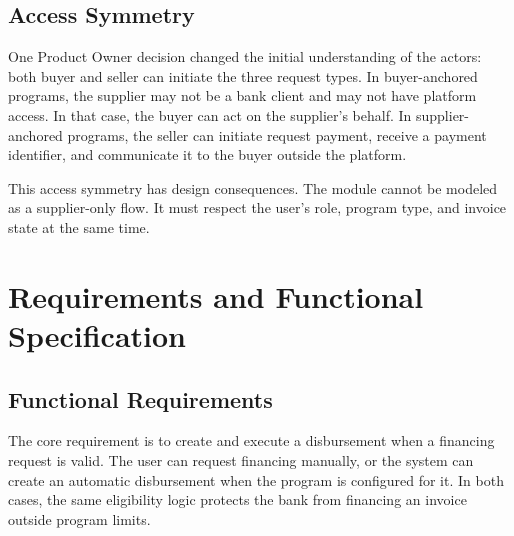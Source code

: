\subsection{Access Symmetry}
\label{subsec:ch5_access_symmetry}

One Product Owner decision changed the initial understanding of the actors: both buyer and seller can initiate the three request types. In buyer-anchored programs, the supplier may not be a bank client and may not have platform access. In that case, the buyer can act on the supplier's behalf. In supplier-anchored programs, the seller can initiate request payment, receive a payment identifier, and communicate it to the buyer outside the platform.

This access symmetry has design consequences. The module cannot be modeled as a supplier-only flow. It must respect the user's role, program type, and invoice state at the same time.

\section{Requirements and Functional Specification}
\label{sec:ch5_requirements}

\subsection{Functional Requirements}
\label{subsec:ch5_functional_requirements}

The core requirement is to create and execute a disbursement when a financing request is valid. The user can request financing manually, or the system can create an automatic disbursement when the program is configured for it. In both cases, the same eligibility logic protects the bank from financing an invoice outside program limits.

